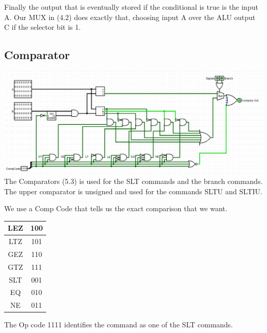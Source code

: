 \documentclass{article}
\begin{document}
Finally the output that is eventually stored if the conditional is true is the input A. Our MUX in (4.2) does exactly that, choosing input A over the ALU output C if the selector bit is 1.

\subsection{Comparator}
\includegraphics{Compare.png}
The Comparators (5.3) is used for the SLT commands and the branch commands. The upper comparator is unsigned and used for the commands SLTU and SLTIU. 

We use a Comp Code that tells us the exact comparison that we want. 

\begin{tabular}{| c | c |}
\hline 
LEZ & 100 \\ \hline
LTZ & 101 \\ \hline
GEZ & 110 \\ \hline
GTZ & 111 \\ \hline
SLT & 001 \\ \hline
EQ &  010 \\ \hline
NE &  011 \\ \hline
\end{tabular}

 The Op code 1111 identifies the command as one of the SLT commands.
\end{document}
